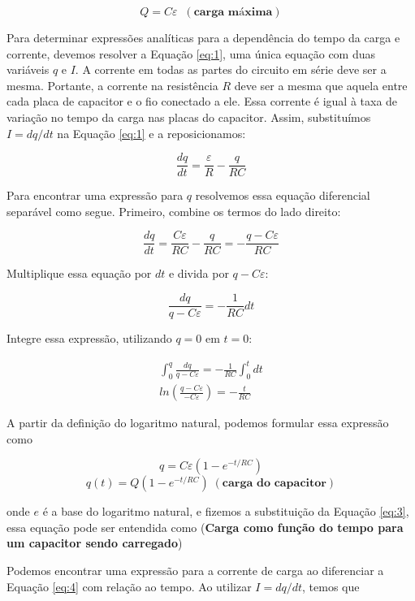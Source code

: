 \documentclass[a4paper,12pt]{article}
\begin{document}
\begin{equation} \label{eq:3}
Q = C\varepsilon \;\; (\textbf{carga máxima})
\end{equation}

Para determinar expressões analíticas para a dependência do tempo da carga e corrente, devemos resolver a Equação \ref{eq:1}, uma única equação com duas variáveis $q$ e $I$. A corrente em todas as partes do circuito em série deve ser a mesma. Portante, a corrente na resistência $R$ deve ser a mesma que aquela entre cada placa de capacitor e o fio conectado a ele. Essa corrente é igual à taxa de variação no tempo da carga nas placas do capacitor. Assim, substituímos $I= dq/dt$ na Equação \ref{eq:1} e a reposicionamos:


$$
\frac{dq}{dt} = \frac{\varepsilon}{R} - \frac{q}{RC}
$$

Para encontrar uma expressão para $q$ resolvemos essa equação diferencial separável como segue. Primeiro, combine os termos do lado direito:

$$
\frac{dq}{dt} = \frac{C\varepsilon}{RC} - \frac{q}{RC} = - \frac{ q-C\varepsilon}{RC}
$$

Multiplique essa equação por $dt$ e divida por $q-C\varepsilon$:

$$
\frac{dq}{q-C\varepsilon} = - \frac{1}{RC}dt
$$

Integre essa expressão, utilizando $q=0$ em $t=0$:

\begin{gather*} 
\int_{0}^{q} \frac{dq}{q-C\varepsilon} = -\frac{1}{RC}\int_{0}^{t}dt \\ 
 ln \left( \frac{q-C\varepsilon}{-C\varepsilon} \right) = - \frac{t}{RC}
\end{gather*}

A partir da definição do logaritmo natural, podemos formular essa expressão como

$$
q=C\varepsilon(1-e^{-t/RC})
$$
\begin{equation} \label{eq:4}
q(t)= Q(1-e^{-t/RC})\;(\textbf{carga do capacitor})
\end{equation}

onde $e$ é a base do logaritmo natural, e fizemos a substituição da Equação \ref{eq:3}, essa equação pode ser entendida como (\textbf{Carga como função do tempo para um capacitor sendo carregado})

Podemos encontrar uma expressão para a corrente de carga ao diferenciar a Equação \ref{eq:4} com relação ao tempo. Ao utilizar $I=dq/dt$, temos que
\end{document}
